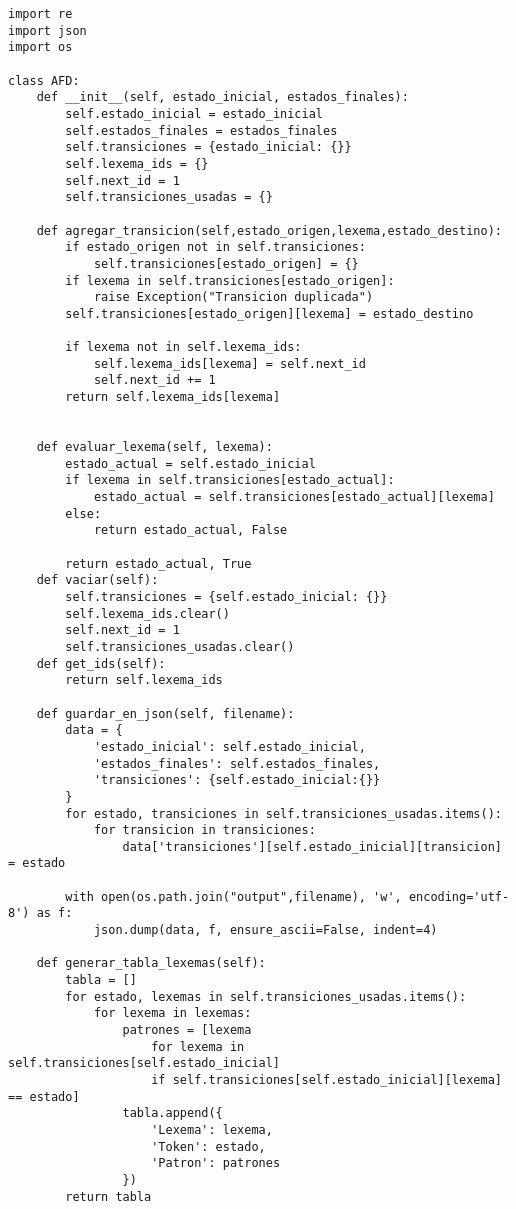 \documentclass[12pt,a4paper]{article}
\begin{document}
\begin{verbatim}
import re
import json
import os

class AFD:
    def __init__(self, estado_inicial, estados_finales):
        self.estado_inicial = estado_inicial
        self.estados_finales = estados_finales
        self.transiciones = {estado_inicial: {}}
        self.lexema_ids = {}
        self.next_id = 1
        self.transiciones_usadas = {}  
        
    def agregar_transicion(self,estado_origen,lexema,estado_destino):
        if estado_origen not in self.transiciones:
            self.transiciones[estado_origen] = {}
        if lexema in self.transiciones[estado_origen]:
            raise Exception("Transicion duplicada")
        self.transiciones[estado_origen][lexema] = estado_destino
        
        if lexema not in self.lexema_ids:
            self.lexema_ids[lexema] = self.next_id
            self.next_id += 1
        return self.lexema_ids[lexema]


    def evaluar_lexema(self, lexema):
        estado_actual = self.estado_inicial
        if lexema in self.transiciones[estado_actual]:
            estado_actual = self.transiciones[estado_actual][lexema]
        else:
            return estado_actual, False

        return estado_actual, True
    def vaciar(self):
        self.transiciones = {self.estado_inicial: {}}
        self.lexema_ids.clear()  
        self.next_id = 1
        self.transiciones_usadas.clear()    
    def get_ids(self):
        return self.lexema_ids

    def guardar_en_json(self, filename):
        data = {
            'estado_inicial': self.estado_inicial,
            'estados_finales': self.estados_finales,
            'transiciones': {self.estado_inicial:{}}
        }
        for estado, transiciones in self.transiciones_usadas.items():
            for transicion in transiciones:
                data['transiciones'][self.estado_inicial][transicion] = estado  
                                    
        with open(os.path.join("output",filename), 'w', encoding='utf-8') as f:
            json.dump(data, f, ensure_ascii=False, indent=4)
        
    def generar_tabla_lexemas(self):
        tabla = []
        for estado, lexemas in self.transiciones_usadas.items():
            for lexema in lexemas:
                patrones = [lexema 
                    for lexema in self.transiciones[self.estado_inicial] 
                    if self.transiciones[self.estado_inicial][lexema] == estado]
                tabla.append({
                    'Lexema': lexema,
                    'Token': estado,
                    'Patron': patrones
                })
        return tabla
\end{verbatim}
\end{document}

